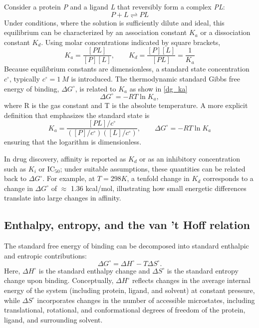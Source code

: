\documentclass[12pt]{article}
\begin{document}
Consider a protein \emph{P} and a ligand \emph{L} that reversibly form a complex \emph{PL}:
\begin{equation}
P + L \rightleftharpoons PL
\label{eq:PL_compl}
\end{equation}
Under conditions, where the solution is sufficiently dilute and ideal, this equilibrium can be characterized by an association constant $K_a$ or a dissociation constant $K_d$. Using molar concentrations indicated by square brackets,
\begin{equation}
K_a = \frac{[PL]}{[P][L]}, \qquad K_d = \frac{[P][L]}{[PL]} = \frac{1}{K_a}
\label{eq:molar_binding}
\end{equation}
Because equilibrium constants are dimensionless, a standard state concentration $c^\circ$, typically $c^\circ = \SI{1}{M}$ is introduced. The thermodynamic standard Gibbs free energy of binding, $\Delta G^\circ$, is related to $K_a$ as show in \ref{dg_ka}
\begin{equation}
\Delta G^\circ = -RT \ln K_a,
\label{eq:dg_ka}
\end{equation}
where R is the gas constant and T is the absolute temperature.\cite{CH3_DillBromberg,CH3_AtkinsDePaula} 
A more explicit definition that emphasizes the standard state is
\begin{equation}
K_a = \frac{[PL]/c^\circ}{([P]/c^\circ)([L]/c^\circ)}, \qquad
\Delta G^\circ = -RT \ln K_a
\label{eq:dg_ka_ext}
\end{equation}
ensuring that the logarithm is dimensionless.

In drug discovery, affinity is reported as $K_d$ or as an inhibitory concentration such as $K_i$ or \(\mathrm{IC}_{50}\); under suitable assumptions, these quantities can be related back to $\Delta G^\circ$.\cite{CH3_GilsonZhou2007} For example, at $T = 298 K$, a tenfold change in $K_d$ corresponds to a change in $\Delta G^\circ$ of $\approx$ 1.36 kcal/mol, illustrating how small energetic differences translate into large changes in affinity.

\subsection{Enthalpy, entropy, and the van 't Hoff relation}

The standard free energy of binding can be decomposed into standard enthalpic and entropic contributions:
\begin{equation}
\Delta G^\circ = \Delta H^\circ - T \Delta S^\circ.
\label{eq:gibbs_eq}
\end{equation}
Here, $\Delta H^\circ$ is the standard enthalpy change and $\Delta S^\circ$ is the standard entropy change upon binding.\cite{CH3_DillBromberg} Conceptually, $\Delta H^\circ$ reflects changes in the average internal energy of the system (including protein, ligand, and solvent) at constant pressure, while $\Delta S^\circ$ incorporates changes in the number of accessible microstates, including translational, rotational, and conformational degrees of freedom of the protein, ligand, and surrounding solvent.
\end{document}
